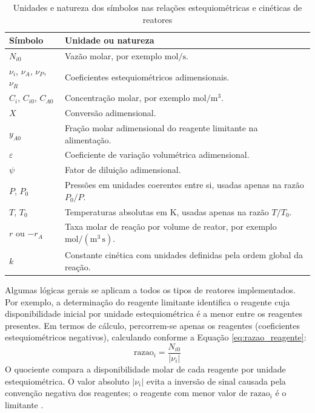\begin{table}[H]
    \centering
    \caption{Unidades e natureza dos símbolos nas relações estequiométricas e cinéticas de reatores}
    \label{tab:unidades-reatores-estequiometria}
    \begin{tabular}{|p{}|p{}|}
        \hline
        \textbf{Símbolo} & \textbf{Unidade ou natureza} \\ \hline
        $N_{i0}$ & Vazão molar, por exemplo $\mathrm{mol/s}$. \\ \hline
        $\nu_i$, $\nu_A$, $\nu_P$, $\nu_R$ & Coeficientes estequiométricos adimensionais. \\ \hline
        $C_i$, $C_{i0}$, $C_{A0}$ & Concentração molar, por exemplo $\mathrm{mol/m^3}$. \\ \hline
        $X$ & Conversão adimensional. \\ \hline
        $y_{A0}$ & Fração molar adimensional do reagente limitante na alimentação. \\ \hline
        $\varepsilon$ & Coeficiente de variação volumétrica adimensional. \\ \hline
        $\psi$ & Fator de diluição adimensional. \\ \hline
        $P$, $P_0$ & Pressões em unidades coerentes entre si, usadas apenas na razão $P_0/P$. \\ \hline
        $T$, $T_0$ & Temperaturas absolutas em $\mathrm{K}$, usadas apenas na razão $T/T_0$. \\ \hline
        $r$ ou $-r_A$ & Taxa molar de reação por volume de reator, por exemplo $\mathrm{mol/(m^3\,s)}$. \\ \hline
        $k$ & Constante cinética com unidades definidas pela ordem global da reação. \\ \hline
    \end{tabular}
\end{table}

Algumas lógicas gerais se aplicam a todos os tipos de reatores implementados. Por exemplo, a determinação do reagente limitante identifica o reagente cuja disponibilidade inicial por unidade estequiométrica é a menor entre os reagentes presentes. Em termos de cálculo, percorrem-se apenas os reagentes (coeficientes estequiométricos negativos), calculando conforme a Equação \ref{eq:razao_reagente}:
\begin{equation}
\mathrm{razao}_{i} = \frac{N_{i0}}{|\nu_i|}
\label{eq:razao_reagente}
\end{equation}
O quociente compara a disponibilidade molar de cada reagente por unidade estequiométrica. O valor absoluto $|\nu_i|$ evita a inversão de sinal causada pela convenção negativa dos reagentes; o reagente com menor valor de $\mathrm{razao}_{i}$ é o limitante \cite{felder2005}.

